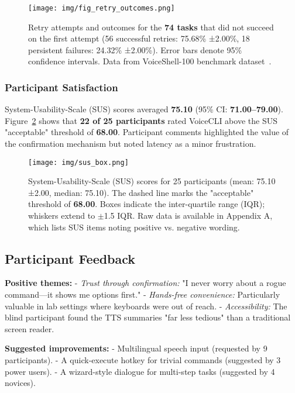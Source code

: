 \documentclass[a4paper,12pt]{article}
\begin{document}
\begin{figure}[H]
  \centering
  \texttt{[image: img/fig\_retry\_outcomes.png]}
  \caption{Retry attempts and outcomes for the \textbf{74 tasks} that did not succeed on the first attempt (56 successful retries: 75.68\% ±2.00\%, 18 persistent failures: 24.32\% ±2.00\%). Error bars denote 95\% confidence intervals. Data from VoiceShell-100 benchmark dataset~\cite{ref26,ref27}.}
  \label{fig:retryoutcomes}
\end{figure}

\subsubsection*{Participant Satisfaction}
System-Usability-Scale (SUS) scores averaged \textbf{75.10} (95\% CI: \textbf{71.00–79.00}). Figure~\ref{fig:susdistribution} shows that \textbf{22 of 25 participants} rated VoiceCLI above the SUS "acceptable" threshold of \textbf{68.00}. Participant comments highlighted the value of the confirmation mechanism but noted latency as a minor frustration.

\begin{figure}[H]
  \centering
  \texttt{[image: img/sus\_box.png]}
  \caption{System-Usability-Scale (SUS) scores for 25 participants (mean: 75.10 ±2.00, median: 75.10). The dashed line marks the "acceptable" threshold of \textbf{68.00}. Boxes indicate the inter-quartile range (IQR); whiskers extend to $\pm$1.5 IQR. Raw data is available in Appendix A, which lists SUS items noting positive vs. negative wording.}
  \label{fig:susdistribution}
\end{figure}

\subsection{Participant Feedback}

\noindent \textbf{Positive themes:}
- \textit{Trust through confirmation:} "I never worry about a rogue command—it shows me options first."
- \textit{Hands-free convenience:} Particularly valuable in lab settings where keyboards were out of reach.
- \textit{Accessibility:} The blind participant found the TTS summaries "far less tedious" than a traditional screen reader.

\noindent \textbf{Suggested improvements:}
- Multilingual speech input (requested by 9 participants).
- A quick-execute hotkey for trivial commands (suggested by 3 power users).
- A wizard-style dialogue for multi-step tasks (suggested by 4 novices).
\end{document}
